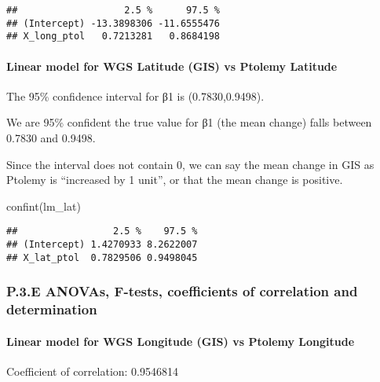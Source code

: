 \documentclass[
]{article}
\newenvironment{Shaded}{\begin{snugshade}}{\end{snugshade}}
\newcommand{\FunctionTok}[1]{\textcolor[rgb]{0.00,0.00,0.00}{#1}}
\newcommand{\NormalTok}[1]{#1}
\begin{document}
\begin{verbatim}
##                   2.5 %      97.5 %
## (Intercept) -13.3898306 -11.6555476
## X_long_ptol   0.7213281   0.8684198
\end{verbatim}

\hypertarget{linear-model-for-wgs-latitude-gis-vs-ptolemy-latitude}{%
\paragraph{Linear model for WGS Latitude (GIS) vs Ptolemy
Latitude}\label{linear-model-for-wgs-latitude-gis-vs-ptolemy-latitude}}

The 95\% confidence interval for β1 is (0.7830,0.9498).

We are 95\% confident the true value for β1 (the mean change) falls
between 0.7830 and 0.9498.

Since the interval does not contain 0, we can say the mean change in GIS
as Ptolemy is ``increased by 1 unit'', or that the mean change is
positive.

\begin{Shaded}
\begin{Highlighting}[]
\FunctionTok{confint}\NormalTok{(lm\_lat)}
\end{Highlighting}
\end{Shaded}

\begin{verbatim}
##                 2.5 %    97.5 %
## (Intercept) 1.4270933 8.2622007
## X_lat_ptol  0.7829506 0.9498045
\end{verbatim}

\hypertarget{p.3.e-anovas-f-tests-coefficients-of-correlation-and-determination}{%
\subsubsection{P.3.E ANOVAs, F-tests, coefficients of correlation and
determination}\label{p.3.e-anovas-f-tests-coefficients-of-correlation-and-determination}}

\hypertarget{linear-model-for-wgs-longitude-gis-vs-ptolemy-longitude-1}{%
\paragraph{Linear model for WGS Longitude (GIS) vs Ptolemy
Longitude}\label{linear-model-for-wgs-longitude-gis-vs-ptolemy-longitude-1}}

Coefficient of correlation: 0.9546814
\end{document}
